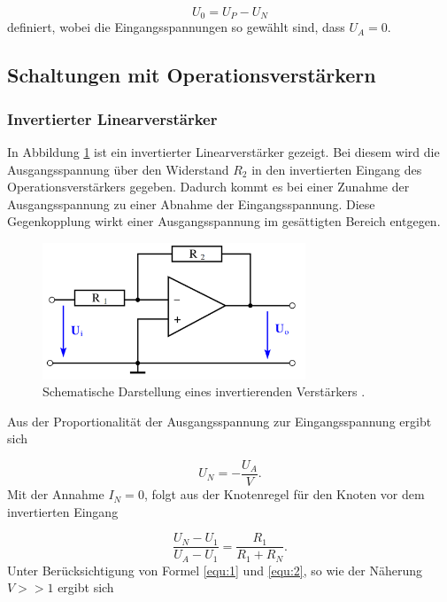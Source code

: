 \begin{equation*}
    U_0 = U_P - U_N
\end{equation*}
definiert, wobei die Eingangsspannungen so gewählt sind, dass $U_A = 0$.



\subsection{Schaltungen mit Operationsverstärkern}
\label{sec:Schaltungen}

\subsubsection{Invertierter Linearverstärker}
\label{sec:Invertierter_Linearverstärker}

In Abbildung \ref{fig:2} ist ein invertierter Linearverstärker gezeigt. 
Bei diesem wird die Ausgangsspannung über den Widerstand $R_2$ in den invertierten Eingang des Operationsverstärkers gegeben. 
Dadurch kommt es bei einer Zunahme der Ausgangsspannung zu einer Abnahme der Eingangsspannung.
Diese Gegenkopplung wirkt einer Ausgangsspannung im gesättigten Bereich entgegen.

\begin{figure}
    \centering
        \includegraphics[width= 0.7\textwidth]{plots/Verstärker.png}
    \caption{Schematische Darstellung eines invertierenden Verstärkers \cite{Anleitung}.}
    \label{fig:2}
\end{figure}

Aus der Proportionalität der Ausgangsspannung zur Eingangsspannung ergibt sich 

\begin{equation}
    \label{equ:1}
    U_N = - \frac{U_A}{V}.
\end{equation}
Mit der Annahme $I_N = 0$, folgt aus der Knotenregel für den Knoten vor dem invertierten Eingang

\begin{equation}
    \label{equ:2}
    \frac{U_N - U_1}{U_A - U_1} = \frac{R_1}{R_1 + R_N}.
\end{equation}
Unter Berücksichtigung von Formel \ref{equ:1} und \ref{equ:2}, so wie der Näherung $V >> 1$ ergibt sich

